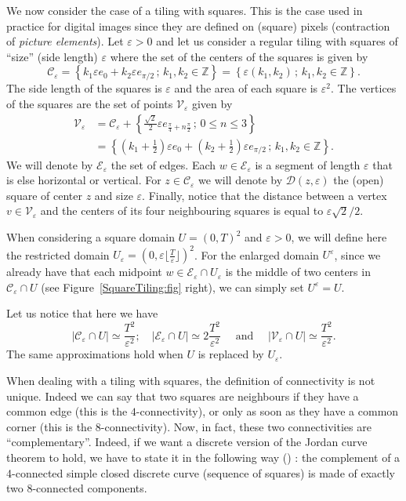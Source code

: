 \documentclass[AHL,Unicode,longabstracts,published]{cedram}
\newcommand{\Z}{\mathbb{Z}}
\newcommand{\eps}{\varepsilon}
\newcommand{\calC}{\mathcal{C}}
\newcommand{\calV}{\mathcal{V}}
\newcommand{\calD}{\mathcal{D}}
\newcommand{\calE}{\mathcal{E}}
\begin{document}
We now consider the case of a tiling with squares. This is the case used in practice for digital images since they are defined on (square) pixels (contraction of \emph{picture elements}). Let $\eps>0$ and let us consider a regular tiling with squares of ``size'' (side length) $\eps$ where the set of the centers of the squares is given by
\[
\calC_\eps = \left\{ k_1 \eps e_0 + k_2 \eps e_{\pi/2} \, ; \, k_1, k_2
\in \Z \right\} = \left\{ \eps (k_1,k_2) \, ; \, k_1, k_2 \in \Z \right\}.
\]
The side length of the squares is $\eps$ and the area of each square is $\eps^2$. The vertices of the squares are the set of points $\calV_\eps$ given by
\begin{align*}
\calV_\eps &= \calC_\eps + \left\{ \frac{\sqrt{2}}{2}\eps e_{\frac{\pi}{4} + n
\frac{\pi}{2}} \, ; \, 0\leq n \leq 3 \right\} \\
&= \left\{ \left(k_1 +\frac{1}{2}\right)
\eps e_0 + \left(k_2 +\frac{1}{2}\right) \eps e_{\pi/2} \, ; \, k_1, k_2 \in \Z \right\}.
\end{align*}
We will denote by $\calE_\eps$ the set of edges. Each $w\in\calE_\eps$ is a segment of length $\eps$ that is else horizontal or vertical. For $z\in
\calC_\eps$ we will denote by $\calD(z,\eps)$ the (open) square of center $z$ and size $\eps$. Finally, notice that the distance between a vertex $v\in\calV_\eps$ and the centers of its four neighbouring squares is equal to $\eps\sqrt{2}/2$.



When considering a square domain $U=(0,T)^2$ and $\eps>0$, we will define here the restricted domain $U_\eps=(0,\eps \lfloor
\tfrac{T}{\eps}\rfloor)^2$. For the enlarged domain $U^\eps$, since we already have that each midpoint $w\in \calE_\eps \cap U_\eps$ is the middle of two centers in ${\calC}_\eps\cap U$ (see Figure~\ref{SquareTiling:fig} right), we can simply set $U^\eps=U$.

Let us notice that here we have
\[
\left|\calC_\eps\cap U\right|\simeq \frac{T^2}{\eps^2} ; \quad\left|\calE_\eps\cap U\right|\simeq 2 \frac{T^2}{\eps^2}
\quad \text{ and } \quad \left|\calV_\eps\cap U\right|\simeq \frac{T^2}{\eps^2}.
\]
The same approximations hold when $U$ is replaced by $U_\eps$.


When dealing with a tiling with squares, the definition of connectivity is not unique. Indeed we can say that two squares are neighbours if they have a common edge (this is the $4$-connectivity), or only as soon as they have a common corner (this is the $8$-connectivity). Now, in fact, these two connectivities are ``complementary''. Indeed, if we want a discrete version of the Jordan curve theorem to hold, we have to state it in the following way (\cite{Rosenfeld79}) : the complement of a 4-connected simple closed discrete curve (sequence of squares) is made of exactly two 8-connected components.
\end{document}
